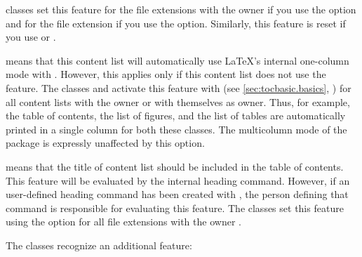 \begin{description}
  \KOMAScript{} classes set this feature for the file extensions with the
  owner  if you use the
   option and for the file
  extension  if you use the
   option. Similarly, this feature
  is reset if you use %
   or
  .
\item[\PValue{onecolumn}] \leavevmode{}%
  means that this content list will automatically use \LaTeX's internal
  one-column mode with .
  However, this applies only if this content list does
  not use the  feature. The
  \KOMAScript{} classes  and  activate this
  feature with  (see
  \autoref{sec:tocbasic.basics}, )
  for all content lists with the owner  or with themselves as
  owner. Thus, for example, the table of contents, the list of figures, and
  the list of tables are automatically printed in a single column for both
  these classes. The multicolumn mode of the
   package is expressly unaffected by
  this option.
\item[\PValue{totoc}] means that the title of content list should be included
  in the table of contents. This feature will be evaluated by the internal
  heading command. However, if an user-defined heading command has been
  created with , the person defining
  that command is responsible for evaluating this feature. The \KOMAScript{}
  classes set this feature using the %
   option for all file extensions with
  the owner .
\end{description}
The \KOMAScript{} classes recognize an additional feature:

